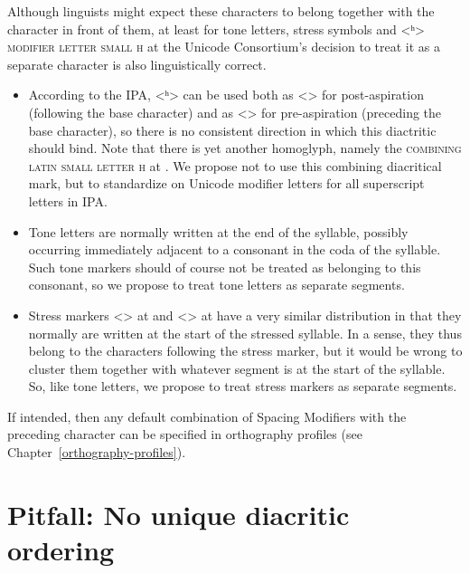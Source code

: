 Although linguists might expect these characters to belong together with the
character in front of them, at least for tone letters, stress symbols and <ʰ>
\textsc{modifier letter small h} at  the Unicode Consortium's decision
to treat it as a separate character is also linguistically correct.

\begin{itemize}
  
   \item According to the IPA, <ʰ> can be used both as <> for
         post-aspiration (following the base character) and as
         <> for pre-aspiration (preceding the base
         character), so there is no consistent direction in which this
         diactritic should bind. Note that there is yet another homoglyph,
         namely the \textsc{combining latin small letter h} at .
         We propose not to use this combining diacritical mark, but to
         standardize on Unicode modifier letters for all superscript
         letters in IPA.
  
   \item Tone letters are normally written at the end of the syllable,
         possibly occurring immediately adjacent to a consonant in the coda of
         the syllable. Such tone markers should of course not be treated as
         belonging to this consonant, so we propose to treat tone letters as 
         separate segments.
 
   \item Stress markers <> at  and
         <> at  have a very similar
         distribution in that they normally are written at the start of
         the stressed syllable. In a sense, they thus belong to the
         characters following the stress marker, but it would be wrong to
         cluster them together with whatever segment is at the start of
         the syllable. So, like tone letters, we propose to treat stress
         markers as separate segments.
 
\end{itemize}

If intended, then any default combination of Spacing Modifiers
with the preceding character can be specified in orthography profiles (see
Chapter~\ref{orthography-profiles}). 

\section{Pitfall: No unique diacritic ordering}
\label{pitfall-no-unique-diacritic-ordering}

